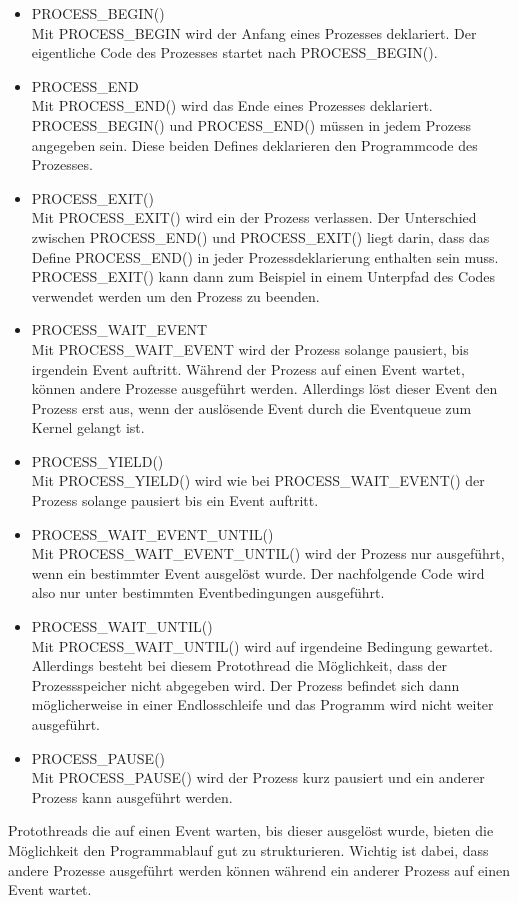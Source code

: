 	\begin{itemize}
		\item PROCESS\_BEGIN()\\
		Mit PROCESS\_BEGIN wird der Anfang eines Prozesses deklariert. Der eigentliche Code des Prozesses startet nach PROCESS\_BEGIN().
		\item PROCESS\_END\\
		Mit PROCESS\_END() wird das Ende eines Prozesses deklariert. PROCESS\_BEGIN() und PROCESS\_END() müssen in jedem Prozess angegeben sein. Diese beiden Defines deklarieren den Programmcode des Prozesses.
		\item PROCESS\_EXIT()\\
		Mit PROCESS\_EXIT() wird ein der Prozess verlassen. Der Unterschied zwischen PROCESS\_END() und PROCESS\_EXIT() liegt darin, dass das Define PROCESS\_END() in jeder Prozessdeklarierung enthalten sein muss. PROCESS\_EXIT() kann dann zum Beispiel in einem Unterpfad des Codes verwendet werden um den Prozess zu beenden.
		\item PROCESS\_WAIT\_EVENT\\
		Mit PROCESS\_WAIT\_EVENT wird der Prozess solange pausiert, bis irgendein Event auftritt. Während der Prozess auf einen Event wartet, können andere Prozesse ausgeführt werden. Allerdings löst dieser Event den Prozess erst aus, wenn der auslösende Event durch die Eventqueue zum Kernel gelangt ist.
		\item PROCESS\_YIELD()\\
		Mit PROCESS\_YIELD() wird wie bei PROCESS\_WAIT\_EVENT() der Prozess solange pausiert bis ein Event auftritt.
		\item PROCESS\_WAIT\_EVENT\_UNTIL()\\
		Mit PROCESS\_WAIT\_EVENT\_UNTIL() wird der Prozess nur ausgeführt, wenn ein bestimmter Event ausgelöst wurde. Der nachfolgende Code wird also nur unter bestimmten Eventbedingungen ausgeführt.
		\item PROCESS\_WAIT\_UNTIL()\\
		Mit PROCESS\_WAIT\_UNTIL() wird auf irgendeine Bedingung gewartet. Allerdings besteht bei diesem Protothread die Möglichkeit, dass der Prozessspeicher nicht abgegeben wird. Der Prozess befindet sich dann möglicherweise in einer Endlosschleife und das Programm wird nicht weiter ausgeführt.
		\item PROCESS\_PAUSE()\\
		Mit PROCESS\_PAUSE() wird der Prozess kurz pausiert und ein anderer Prozess kann ausgeführt werden.
	\end{itemize}
	Protothreads die auf einen Event warten, bis dieser ausgelöst wurde, bieten die Möglichkeit den Programmablauf gut zu strukturieren. Wichtig ist dabei, dass andere Prozesse ausgeführt werden können während ein anderer Prozess auf einen Event wartet.
	
